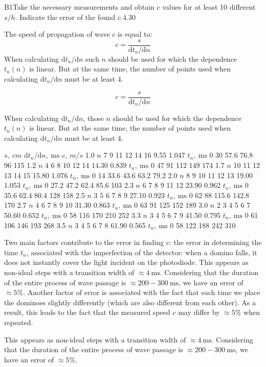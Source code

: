 \documentclass[11pt,a4paper]{article}
\begin{document}
\begin{solcard}{B1}{Take the necessary measurements and obtain $c$ values for at least 10 different $s/h$. Indicate the error of the found $c$.}{4.30}

The speed of propagation of wave $c$ is equal to: \[c=\dfrac{s}{\mathrm{d}t_n/\mathrm{d}n}\] When calculating $\mathrm{d}t_n/\mathrm{d}n$ such $n$ should be used for which the dependence $t_n(n)$ is linear. But at the same time, the number of points used when calculating $\mathrm{d}t_n/\mathrm{d}n$ must be at least 4.


\[c=\dfrac{s}{\mathrm{d}t_n/\mathrm{d}n}\]


When calculating $\mathrm{d}t_n/\mathrm{d}n$, those $n$ should be used for which the dependence $t_n(n)$ is linear. But at the same time, the number of points used when calculating $\mathrm{d}t_n/\mathrm{d}n$ must be at least 4.


$s,~ cm$ $\mathrm{d}t_n/\mathrm{d}n, ~\mathrm{ms}$ $c,~m/s$ 1.0 $n$ 7 9 11 12 14 16 9.55 1.047 $t_n,~\mathrm{ms}$ 0 30 57.6 76.8 96 115 1.2 $n$ 4 6 8 10 12 14 14.30 0.839 $t_n,~\mathrm{ms}$ 0 47 91 112 149 174 1.7 $n$ 10 11 12 13 14 15 15.80 1.076 $t_n,~\mathrm{ms}$ 0 14 33.6 43.6 63.2 79.2 2.0 $n$ 8 9 10 11 12 13 19.00 1.053 $t_n,~\mathrm{ms}$ 0 27.2 47.2 62.4 85.6 103 2.3 $n$ 6 7 8 9 11 12 23.90 0.962 $t_n,~\mathrm{ms}$ 0 35.6 62.4 80.4 128 158 2.5 $n$ 3 5 6 7 8 9 27.10 0.923 $t_n,~\mathrm{ms}$ 0 62 88 115.6 142.8 170 2.7 $n$ 4 6 7 8 9 10 31.30 0.863 $t_n,~\mathrm{ms}$ 0 63 91 125 152 189 3.0 $n$ 2 3 4 5 6 7 50.60 0.652 $t_n,~\mathrm{ms}$ 0 58 116 170 210 252 3.3 $n$ 3 4 5 6 7 9 41.50 0.795 $t_n,~\mathrm{ms}$ 0 61 106 146 193 268 3.5 $n$ 3 4 5 6 7 8 61.90 0.565 $t_n,~\mathrm{ms}$ 0 58 122 188 242 310


Two main factors contribute to the error in finding $c$: the error in determining the time $t_n$, associated with the imperfection of the detector: when a domino falls, it does not instantly cover the light incident on the photodiode. This appears as non-ideal steps with a transition width of $\approx 4~\mathrm{ms}$. Considering that the duration of the entire process of wave passage is $\approx 200-300~\mathrm{ms}$, we have an error of $\approx 5 \%$. Another factor of error is associated with the fact that each time we place the dominoes slightly differently (which are also different from each other). As a result, this leads to the fact that the measured speed $c$ may differ by $\approx 5\%$ when repeated.


This appears as non-ideal steps with a transition width of $\approx 4~\mathrm{ms}$. Considering that the duration of the entire process of wave passage is $\approx 200-300~\mathrm{ms}$, we have an error of $\approx 5 \%$.



\end{solcard}
\end{document}
